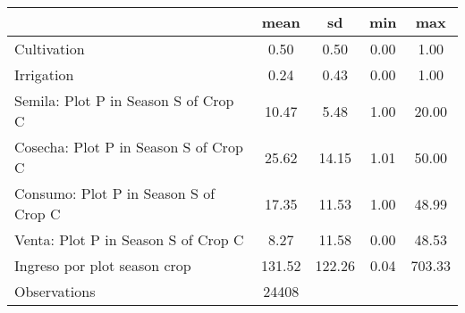 {
\def\sym#1{\ifmmode^{#1}\else\(^{#1}\)\fi}
\begin{tabular}{l*{1}{cccc}}
\hline\hline
                    &        mean&          sd&         min&         max\\
\hline
Cultivation         &        0.50&        0.50&        0.00&        1.00\\
Irrigation          &        0.24&        0.43&        0.00&        1.00\\
Semila: Plot P in Season S of Crop C&       10.47&        5.48&        1.00&       20.00\\
Cosecha: Plot P in Season S of Crop C&       25.62&       14.15&        1.01&       50.00\\
Consumo: Plot P in Season S of Crop C&       17.35&       11.53&        1.00&       48.99\\
Venta: Plot P in Season S of Crop C&        8.27&       11.58&        0.00&       48.53\\
Ingreso por plot season crop&      131.52&      122.26&        0.04&      703.33\\
\hline
Observations        &       24408&            &            &            \\
\hline\hline
\end{tabular}
}
